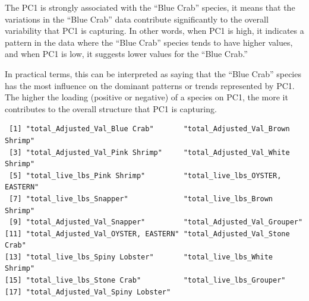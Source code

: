 \documentclass[
  letterpaper,
  DIV=11,
  numbers=noendperiod]{scrartcl}
\newenvironment{Shaded}{\begin{snugshade}}{\end{snugshade}}
\newcommand{\AttributeTok}[1]{\textcolor[rgb]{0.40,0.45,0.13}{#1}}
\newcommand{\CommentTok}[1]{\textcolor[rgb]{0.37,0.37,0.37}{#1}}
\newcommand{\ConstantTok}[1]{\textcolor[rgb]{0.56,0.35,0.01}{#1}}
\newcommand{\DecValTok}[1]{\textcolor[rgb]{0.68,0.00,0.00}{#1}}
\newcommand{\FunctionTok}[1]{\textcolor[rgb]{0.28,0.35,0.67}{#1}}
\newcommand{\NormalTok}[1]{\textcolor[rgb]{0.00,0.23,0.31}{#1}}
\newcommand{\OtherTok}[1]{\textcolor[rgb]{0.00,0.23,0.31}{#1}}
\newcommand{\SpecialCharTok}[1]{\textcolor[rgb]{0.37,0.37,0.37}{#1}}
\begin{document}
The PC1 is strongly associated with the ``Blue Crab'' species, it means
that the variations in the ``Blue Crab'' data contribute significantly
to the overall variability that PC1 is capturing. In other words, when
PC1 is high, it indicates a pattern in the data where the ``Blue Crab''
species tends to have higher values, and when PC1 is low, it suggests
lower values for the ``Blue Crab.''

In practical terms, this can be interpreted as saying that the ``Blue
Crab'' species has the most influence on the dominant patterns or trends
represented by PC1. The higher the loading (positive or negative) of a
species on PC1, the more it contributes to the overall structure that
PC1 is capturing.

\begin{Shaded}
\end{Shaded}

\begin{verbatim}
 [1] "total_Adjusted_Val_Blue Crab"       "total_Adjusted_Val_Brown Shrimp"   
 [3] "total_Adjusted_Val_Pink Shrimp"     "total_Adjusted_Val_White Shrimp"   
 [5] "total_live_lbs_Pink Shrimp"         "total_live_lbs_OYSTER, EASTERN"    
 [7] "total_live_lbs_Snapper"             "total_live_lbs_Brown Shrimp"       
 [9] "total_Adjusted_Val_Snapper"         "total_Adjusted_Val_Grouper"        
[11] "total_Adjusted_Val_OYSTER, EASTERN" "total_Adjusted_Val_Stone Crab"     
[13] "total_live_lbs_Spiny Lobster"       "total_live_lbs_White Shrimp"       
[15] "total_live_lbs_Stone Crab"          "total_live_lbs_Grouper"            
[17] "total_Adjusted_Val_Spiny Lobster"  
\end{verbatim}
\end{document}
